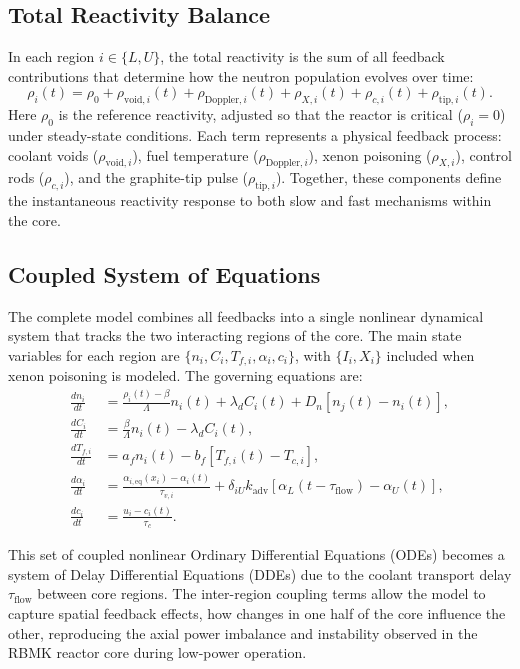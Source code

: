\documentclass[11pt]{article}
\begin{document}
\subsection{Total Reactivity Balance}
In each region $i \in \{L, U\}$, the total reactivity is the sum of all feedback contributions that determine how the neutron population evolves over time:
\begin{equation}
\rho_i(t) = \rho_0
+ \rho_{\mathrm{void},i}(t)
+ \rho_{\mathrm{Doppler},i}(t)
+ \rho_{X,i}(t)
+ \rho_{c,i}(t)
+ \rho_{\mathrm{tip},i}(t).
\label{eq:total_reactivity}
\end{equation}
Here $\rho_0$ is the reference reactivity, adjusted so that the reactor is critical ($\rho_i=0$) under steady-state conditions. Each term represents a physical feedback process: coolant voids ($\rho_{\mathrm{void},i}$), fuel temperature ($\rho_{\mathrm{Doppler},i}$), xenon poisoning ($\rho_{X,i}$), control rods ($\rho_{c,i}$), and the graphite-tip pulse ($\rho_{\mathrm{tip},i}$). Together, these components define the instantaneous reactivity response to both slow and fast mechanisms within the core.

\subsection{Coupled System of Equations}
The complete model combines all feedbacks into a single nonlinear dynamical system that tracks the two interacting regions of the core. The main state variables for each region are $\{n_i, C_i, T_{f,i}, \alpha_i, c_i\}$, with $\{I_i, X_i\}$ included when xenon poisoning is modeled. The governing equations are:
\begin{align*}
    \frac{d n_i}{dt} &= \frac{\rho_i(t) - \beta}{\Lambda}n_i(t) + \lambda_d C_i(t) + D_n[n_j(t) - n_i(t)], \\[4pt]
    \frac{d C_i}{dt} &= \frac{\beta}{\Lambda}n_i(t) - \lambda_d C_i(t), \\[4pt]
    \frac{dT_{f,i}}{dt} &= a_f n_i(t) - b_f[T_{f,i}(t) - T_{c,i}], \\[4pt]
    \frac{d\alpha_i}{dt} &= \frac{\alpha_{i,\mathrm{eq}}(x_i) - \alpha_i(t)}{\tau_{v,i}} + \delta_{iU} k_{\mathrm{adv}}\left[\alpha_L(t - \tau_{\mathrm{flow}}) - \alpha_U(t)\right], \\[4pt]
    \frac{dc_i}{dt} &= \frac{u_i - c_i(t)}{\tau_c}.
\end{align*}

This set of coupled nonlinear Ordinary Differential Equations (ODEs) becomes a system of Delay Differential Equations (DDEs) due to the coolant transport delay $\tau_{\mathrm{flow}}$ between core regions. The inter-region coupling terms allow the model to capture spatial feedback effects, how changes in one half of the core influence the other, reproducing the axial power imbalance and instability observed in the RBMK reactor core during low-power operation.
\end{document}
